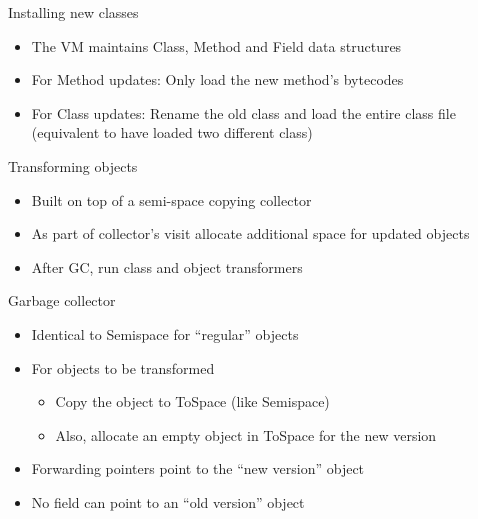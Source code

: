 \begin{frame}[t,fragile,label=classload]{Installing new classes}%
\begin{itemize}
\item The VM maintains Class, Method and Field data structures
\item For Method updates: Only load the new method's bytecodes
\item For Class updates: Rename the old class and load the entire class
file (equivalent to have loaded two different class)
\end{itemize}
\end{frame}

\ifdraft{}{

}

\begin{frame}[t,fragile,label=transform]{Transforming objects}%
\begin{itemize}
\item Built on top of a semi-space copying collector
\item As part of collector's visit allocate additional space for updated
      objects
\item After GC, run class and object transformers
\end{itemize}
\end{frame}

\ifdraft{}{

% 
}

\begin{frame}[t,fragile]{\DSU{} Garbage collector}%
\begin{itemize}
\item Identical to Semispace for ``regular'' objects
\item For objects to be transformed
  \begin{itemize}
  \item Copy the object to ToSpace (like Semispace)
  \item Also, allocate an empty object in ToSpace for the new version
  \end{itemize}
\item Forwarding pointers point to the ``new version'' object
\item No field can point to an ``old version'' object
\end{itemize}
\end{frame}


